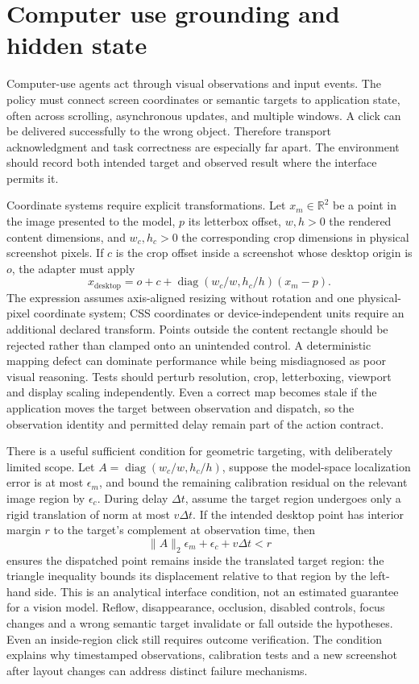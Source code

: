 \section{Computer use grounding and hidden state}\label{sec:C23:computeruse}
Computer-use agents act through visual observations and input events. The policy must connect screen coordinates or semantic targets to application state, often across scrolling, asynchronous updates, and multiple windows. A click can be delivered successfully to the wrong object. Therefore transport acknowledgment and task correctness are especially far apart. The environment should record both intended target and observed result where the interface permits it.

Coordinate systems require explicit transformations. Let $x_m\in\mathbb R^2$ be a point in the image presented to the model, $p$ its letterbox offset, $w,h>0$ the rendered content dimensions, and $w_c,h_c>0$ the corresponding crop dimensions in physical screenshot pixels. If $c$ is the crop offset inside a screenshot whose desktop origin is $o$, the adapter must apply
\begin{equation}
 x_{\mathrm{desktop}}=o+c+
 \operatorname{diag}(w_c/w,h_c/h)(x_m-p).
\end{equation}
The expression assumes axis-aligned resizing without rotation and one physical-pixel coordinate system; CSS coordinates or device-independent units require an additional declared transform. Points outside the content rectangle should be rejected rather than clamped onto an unintended control. A deterministic mapping defect can dominate performance while being misdiagnosed as poor visual reasoning. Tests should perturb resolution, crop, letterboxing, viewport and display scaling independently. Even a correct map becomes stale if the application moves the target between observation and dispatch, so the observation identity and permitted delay remain part of the action contract.

There is a useful sufficient condition for geometric targeting, with deliberately limited scope. Let $A=\operatorname{diag}(w_c/w,h_c/h)$, suppose the model-space localization error is at most $\epsilon_m$, and bound the remaining calibration residual on the relevant image region by $\epsilon_c$. During delay $\Delta t$, assume the target region undergoes only a rigid translation of norm at most $v\Delta t$. If the intended desktop point has interior margin $r$ to the target's complement at observation time, then
\begin{equation}
 \|A\|_2\epsilon_m+\epsilon_c+v\Delta t<r
 \label{eq:C23:target_margin}
\end{equation}
ensures the dispatched point remains inside the translated target region: the triangle inequality bounds its displacement relative to that region by the left-hand side. This is an analytical interface condition, not an estimated guarantee for a vision model. Reflow, disappearance, occlusion, disabled controls, focus changes and a wrong semantic target invalidate or fall outside the hypotheses. Even an inside-region click still requires outcome verification. The condition explains why timestamped observations, calibration tests and a new screenshot after layout changes can address distinct failure mechanisms.

